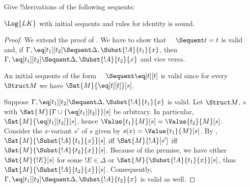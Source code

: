 \documentclass[../../../include/open-logic-section]{subfiles}
\begin{document}
\begin{prob}
Give !!{derivation}s of the following sequents:
\end{prob}

\begin{prop}
$\Log{LK}$ with initial sequents and rules for identity is sound.
\end{prop}

\begin{proof}
We extend the proof of . We have to 
show that $\quad \Sequent t = t$ is valid and, if $\Gamma, \eq[t_1][t_2] 
\Sequent \Delta, \Subst{!A}{t_1}{x}$, then $\Gamma, \eq[t_1][t_2] \Sequent 
\Delta, \Subst{!A}{t _2}{x}$ and vice versa.

An initial sequents of the form $\quad \Sequent \eq[t][t]$ is valid since for every 
$\Struct M$ we have $\Sat{M}{\eq[t][t]}[s]$.

Suppose $\Gamma, \eq[t_1][t_2] \Sequent \Delta, \Subst{!A}{t_1}{x}$ is valid. 
Let $\Struct M$, $s$ with $\Sat{M}{\Gamma \cup \{\eq[t_1][t_2]\}}[s]$ be 
arbitrary. In particular, $\Sat{M}{\eq[t_1][t_2]}[s]$, hence $\Value{t_1}{M}[ 
s ] = \Value{t_2}{M}[s]$. Consider the $x$-variant $s'$ of $s$ given by $s(x) 
= \Value{t_1}{M}[s]$. By , $\Sat{M}{ 
\Subst{!A}{t_1}{x}}[s]$ iff $\Sat{M}{!A}[s']$ iff $\Sat{M}{\Subst{!A}{t_2}{x}}
  [s]$. Because of the premise, we have either $\Sat{M}{!E}[s]$ for some $!E 
\in \Delta$ or $\Sat{M}{\Subst{!A}{t_1}{x}}[s]$, thus $\Sat{M}{\Subst{!A}{t_2 
}{x}}[s]$. Consequently, $\Gamma, \eq[t_1][t_2] \Sequent \Delta, \Subst{!A}{t 
_2}{x}$ is valid as well. 
\end{proof}
\end{document}
